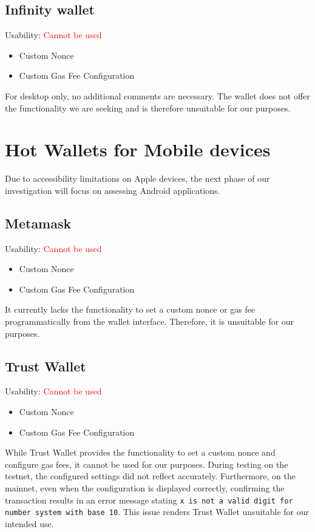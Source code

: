 \documentclass[fleqn,10pt]{olplainarticle}
\newcommand{\xmark}{\ding{55}}%
\begin{document}
\subsection{Infinity wallet}
Usability: \textcolor{red}{Cannot be used}
\begin{itemize}[noitemsep, nolistsep]
	\item [\textcolor{red}{\xmark}] Custom Nonce
	\item [\textcolor{red}{\xmark}] Custom Gas Fee Configuration
\end{itemize}
For desktop only, no additional comments are necessary. The wallet does not offer the functionality we are seeking and is therefore unsuitable for our purposes.

\section{Hot Wallets for Mobile devices}
Due to accessibility limitations on Apple devices, the next phase of our investigation will focus on assessing Android applications.


\subsection{Metamask}
Usability: \textcolor{red}{Cannot be used}
\begin{itemize}[noitemsep, nolistsep]
	\item [\textcolor{red}{\xmark}] Custom Nonce
	\item [\textcolor{red}{\xmark}] Custom Gas Fee Configuration
\end{itemize}
It currently lacks the functionality to set a custom nonce or gas fee programmatically from the wallet interface. Therefore, it is unsuitable for our purposes.

\subsection{Trust Wallet}
Usability: \textcolor{red}{Cannot be used}
\begin{itemize}[noitemsep, nolistsep]
	\item [\textcolor{red}{\xmark}]  Custom Nonce
	\item [\textcolor{red}{\xmark}]  Custom Gas Fee Configuration
\end{itemize}
While Trust Wallet provides the functionality to set a custom nonce and configure gas fees, it cannot be used for our purposes. During testing on the testnet, the configured settings did not reflect accurately. Furthermore, on the mainnet, even when the configuration is displayed correctly, confirming the transaction results in an error message stating \texttt{x is not a valid digit for number system with base 10}. This issue renders Trust Wallet unsuitable for our intended use.
\end{document}
